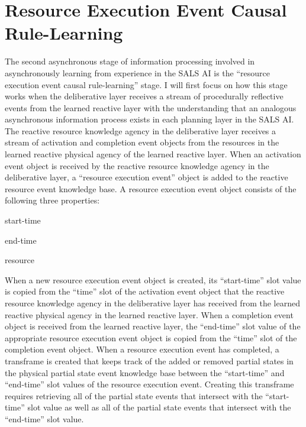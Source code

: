 \section{Resource Execution Event Causal Rule-Learning}

The second asynchronous stage of information processing involved in
asynchronously learning from experience in the SALS AI is the
``resource execution event causal rule-learning'' stage.  I will
first focus on how this stage works when the deliberative layer
receives a stream of procedurally reflective events from the learned
reactive layer with the understanding that an analogous asynchronous
information process exists in each planning layer in the SALS AI.  The
reactive resource knowledge agency in the deliberative layer receives
a stream of activation and completion event objects from the resources
in the learned reactive physical agency of the learned reactive layer.
When an activation event object is received by the reactive resource
knowledge agency in the deliberative layer, a ``resource execution
event'' object is added to the reactive resource event knowledge base.
A resource execution event object consists of the following three
properties:
\begin{packed_enumerate}
\item{start-time}
\item{end-time}
\item{resource}
\end{packed_enumerate}
When a new resource execution event object is created, its
``start-time'' slot value is copied from the ``time'' slot of the
activation event object that the reactive resource knowledge agency in
the deliberative layer has received from the learned reactive physical
agency in the learned reactive layer.  When a completion event object
is received from the learned reactive layer, the ``end-time'' slot
value of the appropriate resource execution event object is copied
from the ``time'' slot of the completion event object.  When a
resource execution event has completed, a transframe
\cite[]{minsky:1975} is created that keeps track of the added or
removed partial states in the physical partial state event knowledge
base between the ``start-time'' and ``end-time'' slot values of the
resource execution event.  Creating this transframe requires
retrieving all of the partial state events that intersect with the
``start-time'' slot value as well as all of the partial state events
that intersect with the ``end-time'' slot value.

